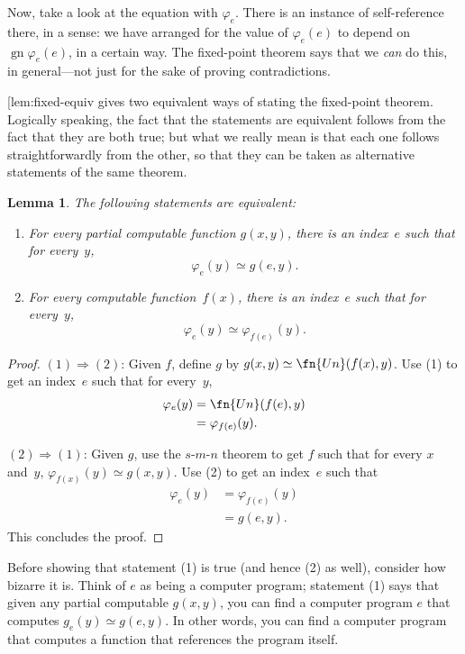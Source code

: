 \documentclass[10pt,a4paper]{article}
\makeatletter
\theoremstyle{plain}
\newtheorem{lem}[thm]{Lemma}
\theoremstyle{definition}
\theoremstyle{remark}
\newenvironment{explain}{}{}
\newcommand*{\ollabel}[1]{\label{#1}}
\newcommand{\olref}{\@ifnextchar[{\olref@i}{\olref@final}}
\def\olref@i[#1]{\@ifnextchar[{\olref@ii}{\olref@final}}
\def\olref@ii[#1]{\@ifnextchar[{\olref@iii}{\olref@final}}
\def\olref@iii[#1]{\olref@final}
\def\olref@final#1{\ref{#1}}
\providecommand{\cfind}[1]{\varphi_{#1}}
\providecommand{\gn}{\operatorname{gn}}
\makeatother
\begin{document}
Now, take a look at the equation with $\cfind{e}$. There is an instance of
self-reference there, in a sense: we have arranged for the value of
$\cfind{e}(e)$ to depend on $\gn{\cfind{e}(e)}$, in a certain way. The
fixed-point theorem says that we {\em can} do this, in general---not
just for the sake of proving contradictions.

\olref{lem:fixed-equiv} gives two equivalent ways of stating the
fixed-point theorem. Logically speaking, the fact that the statements
are equivalent follows from the fact that they are both true; but what
we really mean is that each one follows straightforwardly from the
other, so that they can be taken as alternative statements of the same
theorem.

\begin{lem}
\ollabel{lem:fixed-equiv}
The following statements are equivalent:
\begin{enumerate}
\item For every partial computable function $g(x,y)$, there is an
  index~$e$ such that for every~$y$,
\[
\cfind{e}(y) \simeq g(e,y).
\]
\item For every computable function~$f(x)$, there is an index~$e$ such
  that for every~$y$,
\[
\cfind{e}(y) \simeq \cfind{f(e)}(y).
\]
\end{enumerate}
\end{lem}

\begin{proof}
$(1) \Rightarrow (2)$: Given $f$, define $g$ by $g(x,y) \simeq
\fn{Un}(f(x),y)$. Use (1) to get an index~$e$ such that for every~$y$,
\begin{align*}
\cfind{e}(y) & = \fn{Un}(f(e),y) \\
& = \cfind{f(e)}(y).
\end{align*}

$(2) \Rightarrow (1)$: Given $g$, use the $s$-$m$-$n$ theorem to get $f$ such
that for every $x$ and~$y$, $\cfind{f(x)}(y) \simeq g(x,y)$. Use (2) to
get an index~$e$ such that
\begin{align*}
\cfind{e}(y) & = \cfind{f(e)}(y) \\
& = g(e,y).
\end{align*}
This concludes the proof.
\end{proof}

\begin{explain}
Before showing that statement (1) is true (and hence (2) as well),
consider how bizarre it is. Think of $e$ as being a computer program;
statement (1) says that given any partial computable $g(x,y)$, you can
find a computer program $e$ that computes $g_e(y) \simeq g(e,y)$. In
other words, you can find a computer program that computes a function
that references the program itself.
\end{explain}
\end{document}
